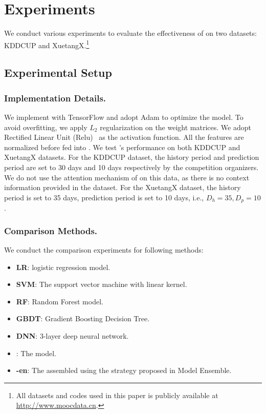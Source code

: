 \section{Experiments}
	We conduct various experiments to evaluate the effectiveness of \modelname{} on two datasets: KDDCUP  and XuetangX.\footnote{All datasets and codes used in this paper is publicly available at \url{http://www.moocdata.cn}.}
	
\subsection{Experimental Setup} 
	\subsubsection{Implementation Details.}We implement \modelname{} with TensorFlow  
	and adopt Adam \cite{kingma2014adam} to optimize the model. To avoid overfitting, we apply $L_2$ regularization on the weight matrices. We adopt Rectified Linear Unit (Relu)~\cite{nair2010rectified} as the activation function. All the features are normalized before fed into \modelname{}. We test \modelname{}'s performance on both KDDCUP  and XuetangX datasets. For the KDDCUP dataset, the history period and prediction period are set to 30 days and 10 days respectively by the competition organizers. We do not use the attention mechanism of \modelname{} on this data, as there is no context information provided in the dataset. For the XuetangX dataset, the history period is set to 35 days, prediction period is set to 10 days, i.e., $D_h=35, D_p=10$.
	
    
	\subsubsection{Comparison Methods.}
	We conduct the comparison experiments for following methods:
	\begin{itemize}
		\item{\textbf{LR}}: logistic regression model.
		\item{\textbf{SVM}}: The support vector machine with linear kernel.
		\item{\textbf{RF}}: Random Forest model.
		\item{\textbf{GBDT}}: Gradient Boosting Decision Tree.
		\item{\textbf{DNN}}: $3$-layer deep neural network.
	    \item{\textbf{\modelname{}}}: The \modelname{} model.
		\item{\textbf{\modelname{}-en}}: The assembled \modelname{} using the strategy proposed in Model Ensemble.
\end{itemize}	

